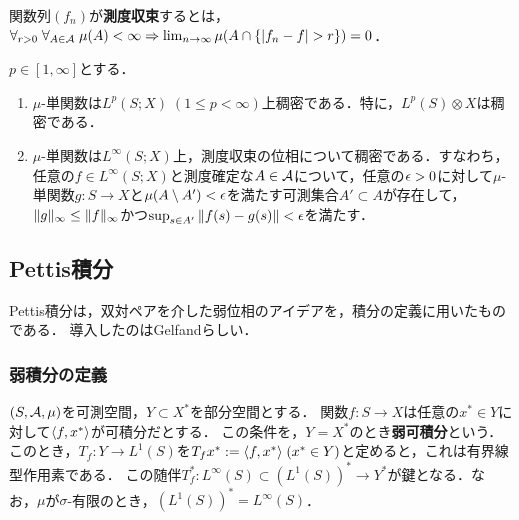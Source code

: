 \documentclass[uplatex,dvipdfmx]{jsreport}
\begin{document}
\begin{definition}
    関数列$(f_n)$が\textbf{測度収束}するとは，$\forall_{r>0}\;\forall_{A\in\mathcal{A}}\;\mu(A)<\infty\Rightarrow\lim_{n\to\infty}\mu(A\cap\left\{\lvert f_n-f\rvert>r\right\})=0$．
\end{definition}

\begin{lemma}
    $p\in[1,\infty]$とする．
    \begin{enumerate}
        \item $\mu$-単関数は$L^p(S;X)\;(1\le p<\infty)$上稠密である．特に，$L^p(S)\otimes X$は稠密である．
        \item $\mu$-単関数は$L^\infty(S;X)$上，測度収束の位相について稠密である．すなわち，任意の$f\in L^\infty(S;X)$と測度確定な$A\in\mathcal{A}$について，任意の$\epsilon>0$に対して$\mu$-単関数$g:S\to X$と$\mu(A\setminus A')<\epsilon$を満たす可測集合$A'\subset A$が存在して，$\|g\|_\infty\le\|f\|_\infty$かつ$\sup_{s\in A'}\|f(s)-g(s)\|<\epsilon$を満たす．
    \end{enumerate}
\end{lemma}

\subsection{Pettis積分}\label{subsection-Pettis-integral}

\begin{tcolorbox}[colframe=ForestGreen, colback=ForestGreen!10!white,breakable,colbacktitle=ForestGreen!40!white,coltitle=black,fonttitle=\bfseries\sffamily,
title=]
    Pettis積分は，双対ペアを介した弱位相のアイデアを，積分の定義に用いたものである．
    導入したのはGelfandらしい．
\end{tcolorbox}

\subsubsection{弱積分の定義}

\begin{notation}
    $(S,\mathcal{A},\mu)$を可測空間，$Y\subset X^*$を部分空間とする．
    関数$f:S\to X$は任意の$x^*\in Y$に対して$\langle f,x^*\rangle$が可積分だとする．
    この条件を，$Y=X^*$のとき\textbf{弱可積分}という．
    このとき，$T_f:Y\to L^1(S)$を$T_fx^*:=\langle f,x^*\rangle\;(x^*\in Y)$と定めると，これは有界線型作用素である．
    この随伴$T_f^*:L^\infty(S)\subset(L^1(S))^*\to Y^*$が鍵となる．なお，$\mu$が$\sigma$-有限のとき，$(L^1(S))^*=L^\infty(S)$．
\end{notation}
\end{document}
